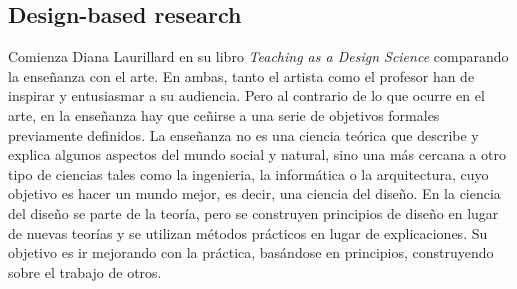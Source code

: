 


\subsection{Design-based research}

Comienza Diana Laurillard en su libro \emph{Teaching as a Design Science} comparando la enseñanza con el arte. En ambas, tanto el artista como el profesor han de inspirar y entusiasmar a su audiencia. Pero al contrario de lo que ocurre en el arte, en la enseñanza hay que ceñirse a una serie de objetivos formales previamente definidos. La enseñanza no es una ciencia teórica que describe y explica algunos aspectos del mundo social y natural, sino una más cercana a otro tipo de ciencias tales como la ingenieria, la informática o la arquitectura, cuyo objetivo es hacer un mundo mejor, es decir, una ciencia del diseño. En la ciencia del diseño se parte de la teoría, pero se construyen principios de diseño en lugar de nuevas teorías y se utilizan métodos prácticos en lugar de explicaciones. Su objetivo es ir mejorando con la práctica, basándose en principios, construyendo sobre el trabajo de otros.

